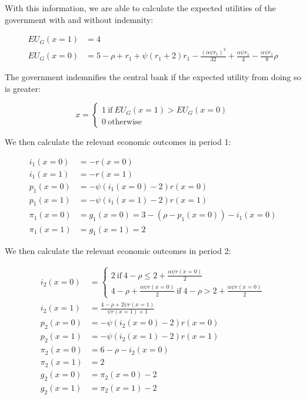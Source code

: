 \documentclass[
  a4paper,
  abstract=true]{scrartcl}
\theoremstyle{definition}
\begin{document}
With this information, we are able to calculate the expected utilities
of the government with and without indemnity:

\begin{align*}
EU_G(x=1)&=4 \\
EU_G(x=0)&=5-\rho+r_1+\psi(r_1+2)r_1-\frac{(\alpha\psi r_1)^2}{32}+\frac{\alpha\psi r_1}{4}-\frac{\alpha\psi r_1}{8}\rho
\end{align*}

The government indemnifies the central bank if the expected utility from
doing so is greater:

\[ 
x=\begin{cases} 
1~\text{if}~ EU_G(x=1)>EU_G(x=0)\\ 
0~\text{otherwise} 
\end{cases} 
\]

We then calculate the relevant economic outcomes in period 1:

\begin{align*}
i_1(x=0)&=-r(x=0) \\
i_1(x=1)&=-r(x=1) \\
p_1(x=0)&=-\psi(i_1(x=0)-2)r(x=0) \\
p_1(x=1)&=-\psi(i_1(x=1)-2)r(x=1) \\
\pi_1(x=0)&=g_1(x=0)=3-(\rho-p_1(x=0))-i_1(x=0) \\
\pi_1(x=1)&=g_1(x=1)=2
\end{align*}

We then calculate the relevant economic outcomes in period 2:

\begin{align*}
i_2(x=0)&=\begin{cases}
2~\text{if}~4-\rho\leq2+\frac{\alpha\psi r(x=0)}{2}\\
4-\rho+\frac{\alpha\psi r(x=0)}{2}~\text{if}~4-\rho>2+\frac{\alpha\psi r(x=0)}{2}
\end{cases}\\
i_2(x=1)&=\frac{4-\rho+2\psi r(x=1)}{\psi r(x=1)+1} \\
p_2(x=0)&=-\psi(i_2(x=0)-2)r(x=0) \\
p_2(x=1)&=-\psi(i_2(x=1)-2)r(x=1) \\
\pi_2(x=0)&=6-\rho-i_2(x=0) \\
\pi_2(x=1)&=2 \\
g_2(x=0)&=\pi_2(x=0)-2 \\
g_2(x=1)&=\pi_2(x=1)-2
\end{align*}

\newpage
\end{document}
